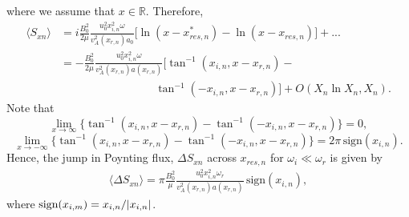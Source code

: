 where we assume that $x\in\mathds{R}$.
Therefore,
\begin{equation}
\begin{aligned}
    \label{eq:chap_4_avg_poy_flux_leading_order_alpha=0}
    \langle S_{xn} \rangle &= i\frac{B_0^2}{2\mu}\frac{u_0^2x_{i,n}^2\omega}{v_{A}^2(x_{r,n})a_{0}}\big[\ln(x-x_{res,n}^*)-\ln(x-x_{res,n})\big] + ...  \\
    &= -\frac{B_0^2}{2\mu}\frac{u_0^2x_{i,n}^2\omega}{v_{A}^2(x_{r,n})a(x_{r,n})}\big[\tan^{-1}(x_{i,n},x-x_{r,n})-\\
    &\qquad\qquad\qquad\qquad\ \ \tan^{-1}(-x_{i,n},x-x_{r,n})\big] + O(X_n\ln X_n, X_n).
\end{aligned}
\end{equation}
Note that
\[\lim_{x\rightarrow\infty}\big\{\tan^{-1}(x_{i,n},x-x_{r,n})-\tan^{-1}(-x_{i,n},x-x_{r,n})\big\}=0,\]
\[\lim_{x\rightarrow-\infty}\big\{\tan^{-1}(x_{i,n},x-x_{r,n})-\tan^{-1}(-x_{i,n},x-x_{r,n})\big\}=2\pi\,\text{sign}(x_{i,n}).\]
Hence, the jump in Poynting flux, $\Delta S_{xn}$ across $x_{res,n}$ for $\omega_i\ll\omega_r$ is given by
\begin{equation}
    \label{eq:chap_4_jump_in_poynting_flux}
    \begin{aligned}
    \langle \Delta S_{xn}\rangle = \pi\frac{B_0^2}{\mu}\frac{u_0^2x_{i,n}^2\omega_r}{v_{A}^2(x_{r,n})a(x_{r,n})}\,\text{sign}(x_{i,n}),
    \end{aligned}
\end{equation}
where $\text{sign}(x_{i,m}) = x_{i,n}/\abs{x_{i,n}}$.

